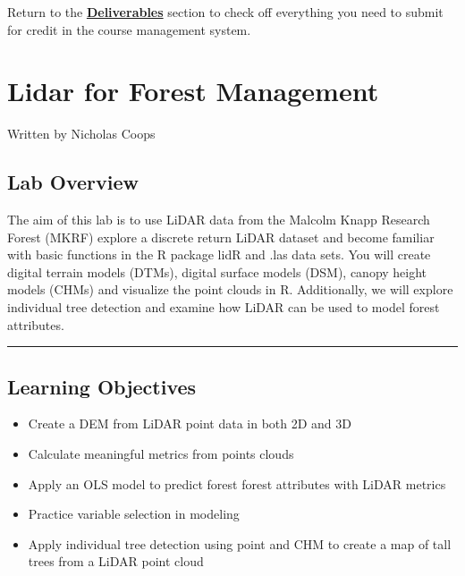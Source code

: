 \documentclass[
]{book}
\providecommand{\tightlist}{%
  \setlength{\itemsep}{0pt}\setlength{\parskip}{0pt}}
\begin{document}
Return to the \protect\hyperlink{lab2-deliverables}{\textbf{Deliverables}} section to check off everything you need to submit for credit in the course management system.

\hypertarget{lidar-for-forest-management}{%
\chapter{Lidar for Forest Management}\label{lidar-for-forest-management}}

Written by
Nicholas Coops

\hypertarget{lab-overview-2}{%
\section*{Lab Overview}\label{lab-overview-2}}

The aim of this lab is to use LiDAR data from the Malcolm Knapp Research Forest (MKRF) explore a discrete return LiDAR dataset and become familiar with basic functions in the R package lidR and .las data sets. You will create digital terrain models (DTMs), digital surface models (DSM), canopy height models (CHMs) and visualize the point clouds in R. Additionally, we will explore individual tree detection and examine how LiDAR can be used to model forest attributes.

\begin{center}\rule{0.5\linewidth}{0.5pt}\end{center}

\hypertarget{learning-objectives-2}{%
\section*{Learning Objectives}\label{learning-objectives-2}}

\begin{itemize}
\tightlist
\item
  Create a DEM from LiDAR point data in both 2D and 3D
\item
  Calculate meaningful metrics from points clouds
\item
  Apply an OLS model to predict forest forest attributes with LiDAR metrics
\item
  Practice variable selection in modeling
\item
  Apply individual tree detection using point and CHM to create a map of tall trees from a LiDAR point cloud
\end{itemize}
\end{document}
